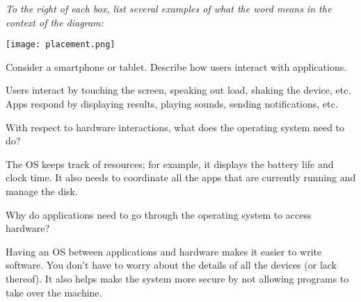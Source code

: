 
\textit{To the right of each box, list several examples of what the word means in the context of the diagram:}

\vspace{1em}

\begin{minipage}{2in}

\texttt{[image: placement.png]}

\end{minipage}
\begin{minipage}{4in}

\vspace{4pt}

\vspace{32pt}

\vspace{32pt}

\vspace{32pt}

\end{minipage}




\Q Consider a smartphone or tablet. Describe how users interact with applications.

\begin{answer}[5em]
Users interact by touching the screen, speaking out load, shaking the device, etc.
Apps respond by displaying results, playing sounds, sending notifications, etc.
\end{answer}


\Q With respect to hardware interactions, what does the operating system need to do?

\begin{answer}[5em]
The OS keeps track of resources; for example, it displays the battery life and clock time.
It also needs to coordinate all the apps that are currently running and manage the disk.
\end{answer}


\Q Why do applications need to go through the operating system to access hardware?

\begin{answer}[5em]
Having an OS between applications and hardware makes it easier to write software.
You don't have to worry about the details of all the devices (or lack thereof).
It also helps make the system more secure by not allowing programs to take over the machine.
\end{answer}
